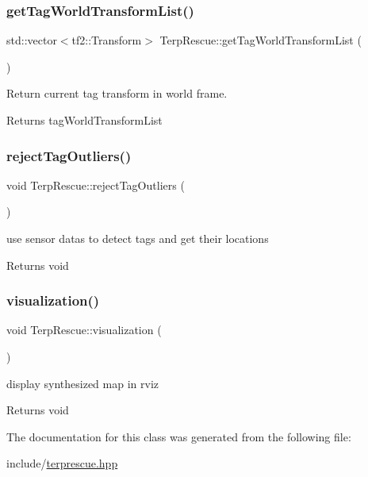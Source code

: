 \subsubsection{\texorpdfstring{get\+Tag\+World\+Transform\+List()}{getTagWorldTransformList()}}
{\footnotesize\ttfamily std\+::vector$<$tf2\+::\+Transform$>$ Terp\+Rescue\+::get\+Tag\+World\+Transform\+List (\begin{DoxyParamCaption}{ }\end{DoxyParamCaption})}



Return current tag transform in world frame. 

\begin{DoxyReturn}{Returns}
tag\+World\+Transform\+List 
\end{DoxyReturn}
\mbox{\label{classTerpRescue_af95c5deb5e883e5986f957f42a89041e}} 
\subsubsection{\texorpdfstring{reject\+Tag\+Outliers()}{rejectTagOutliers()}}
{\footnotesize\ttfamily void Terp\+Rescue\+::reject\+Tag\+Outliers (\begin{DoxyParamCaption}{ }\end{DoxyParamCaption})}



use sensor datas to detect tags and get their locations 

\begin{DoxyReturn}{Returns}
void 
\end{DoxyReturn}
\mbox{\label{classTerpRescue_ae961a3e24e9ecd48ca2d8bb377955e46}} 
\subsubsection{\texorpdfstring{visualization()}{visualization()}}
{\footnotesize\ttfamily void Terp\+Rescue\+::visualization (\begin{DoxyParamCaption}{ }\end{DoxyParamCaption})}



display synthesized map in rviz 

\begin{DoxyReturn}{Returns}
void 
\end{DoxyReturn}


The documentation for this class was generated from the following file\+:\begin{DoxyCompactItemize}
\item 
include/\hyperlink{terprescue_8hpp}{terprescue.\+hpp}\end{DoxyCompactItemize}
